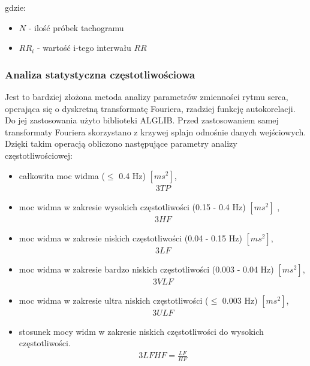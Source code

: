 gdzie:
\begin{itemize}
\item $N$ - ilość próbek tachogramu
\item $RR_i$ - wartość i-tego interwału $RR$
\end{itemize}

\vspace{10mm}

\subsubsection{Analiza statystyczna częstotliwościowa }


\tab Jest to bardziej złożona metoda analizy parametrów zmienności rytmu serca, operająca się o dyskretną transformatę Fouriera, rzadziej funkcję autokorelacji. Do jej zastosowania użyto biblioteki ALGLIB. Przed zastosowaniem samej transformaty Fouriera skorzystano z krzywej splajn odnośnie danych wejściowych. Dzięki takim operacją obliczono następujące parametry analizy częstotliwościowej:

\vspace{10mm}

\begin{itemize} \itemsep0pt \parskip0pt 
\item całkowita moc widma ($\leq$ 0.4 Hz) $[ms^{2}]$,
\begin{alignat*}{3}
TP
\end{alignat*}
\item moc widma w zakresie wysokich częstotliwości (0.15 - 0.4 Hz) $[ms^{2}]$ ,
\begin{alignat*}{3}
HF
\end{alignat*}
\item moc widma w zakresie niskich częstotliwości (0.04 - 0.15 Hz) $[ms^{2}]$,
\begin{alignat*}{3}
LF
\end{alignat*}
\item moc widma w zakresie bardzo niskich częstotliwości (0.003 - 0.04 Hz) $[ms^{2}]$,
\begin{alignat*}{3}
VLF
\end{alignat*}
\item moc widma w zakresie ultra niskich częstotliwości ($\leq$ 0.003 Hz) $[ms^{2}]$,
\begin{alignat*}{3}
ULF
\end{alignat*}
\item stosunek mocy widm w zakresie niskich częstotliwości do wysokich częstotliwości.
\begin{alignat*}{3}
LFHF = \frac{LF}{HF}
\end{alignat*}
\end{itemize}

